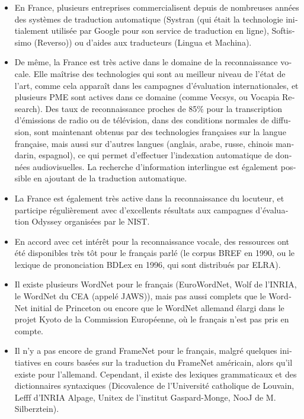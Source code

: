 \begin{french}
\begin{multicols}{2}
\begin{itemize}
\item En France, plusieurs entreprises commercialisent depuis de nombreuses
années des systèmes de traduction automatique (Systran (qui était la
technologie initialement utilisée par Google pour son service de
traduction en ligne), Softissimo (Reverso)) ou d'aides aux traducteurs
(Lingua et Machina).

\item De même, la France est très active dans le domaine de la
reconnaissance vocale. Elle maîtrise des technologies qui sont au
meilleur niveau de l'état de l'art, comme cela apparaît dans les
campagnes d'évaluation internationales, et plusieurs PME sont actives
dans ce domaine (comme Vecsys, ou Vocapia Research). Des taux de
reconnaissance proches de 85\% pour la transcription d'émissions de
radio ou de télévision, dans des conditions normales de diffusion,
sont maintenant obtenus par des technologies françaises sur la langue
française, mais aussi sur d'autres langues (anglais, arabe, russe,
chinois mandarin, espagnol), ce qui permet d'effectuer l'indexation automatique
de données audiovisuelles. La recherche d'information interlingue est
également possible en ajoutant de la traduction automatique.

\item La France est également très active dans la reconnaissance du
locuteur, et participe régulièrement avec d'excellents résultats aux
campagnes d'évaluation Odyssey organisées par le NIST.

\item En accord avec cet intérêt pour la reconnaissance vocale, des
ressources ont été disponibles très tôt pour le français parlé (le
corpus BREF en 1990, ou le lexique de prononciation BDLex en 1996, qui
sont distribués par ELRA).

\item Il existe plusieurs WordNet pour le français (EuroWordNet, Wolf
  de l'INRIA, le WordNet du CEA (appelé JAWS)), mais pas aussi
  complets que le WordNet initial de Princeton ou encore que le
  WordNet allemand élargi dans le projet Kyoto de la Commission
  Européenne, où le français n'est pas pris en compte.

\item Il n'y a pas encore de grand FrameNet pour le français, malgré
quelques initiatives en cours basées sur la traduction du FrameNet
américain, alors qu'il existe pour l'allemand. Cependant, il existe
des lexiques grammaticaux et des dictionnaires syntaxiques
(Dicovalence de l'Université catholique de Louvain, Lefff d'INRIA
Alpage, Unitex de l'institut Gaspard-Monge, NooJ de M. Silberztein).


\end{itemize}
\end{multicols}
\end{french}
